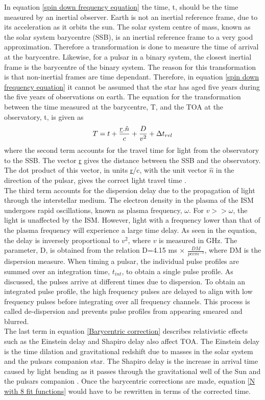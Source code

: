 \documentclass[12pt]{article}
\begin{document}
	\noindent In equation \ref{spin down frequency equation} the time, t, should be the time measured by an inertial observer. Earth is not an inertial reference frame, due to its acceleration as it orbits the sun. The solar system centre of mass, known as the solar system barycentre (SSB), is an inertial reference frame to a very good approximation. Therefore a transformation is done to measure the time of arrival at the barycentre. Likewise, for a pulsar in a binary system, the closest inertial frame is the barycentre of the binary system. The reason for this transformation is that non-inertial frames are time dependant. Therefore, in equation \ref{spin down frequency equation} it cannot be assumed that the star has aged five years during the five years of observations on earth. The equation for the transformation between the time measured at the barycentre, T, and the TOA at the observatory, t, is given as
	\begin{equation}\label{Barycentric correction}
	T=t+\frac{\uline{r}.\hat{n}}{c}+\frac{D}{v^2}+\Delta t_{rel}
	\end{equation}
	where the second term accounts for the travel time for light from the observatory to the SSB. The vector \uline{r} gives the distance between the SSB and the observatory. The dot product of this vector, in units \uline{r}/c, with the unit vector $\hat{n}$ in the direction of the pulsar, gives the correct light travel time \cite{backer1986pulsar}.\\ 
	
	\noindent The third term accounts for the dispersion delay due to the propagation of light through the interstellar medium. The electron density in the plasma of the ISM undergoes rapid oscillations, known as plasma frequency, $\omega$. For $v>>\omega$, the light is unaffected by the ISM. However, light with a frequency lower than that of the plasma frequency will experience a large time delay. As seen in the equation, the delay is inversely proportional to $v^2$, where $v$ is measured in GHz. The parameter, D, is obtained from the relation D=4.15 ms $\times$ $\frac{DM}{pc cm^{-3}}$, where DM is the dispersion measure. When timing a pulsar, the individual pulse profiles are summed over an integration time, $t_{int}$, to obtain a single pulse profile. As discussed, the pulses arrive at different times due to dispersion. To obtain an integrated pulse profile, the high frequency pulses are delayed to align with low frequency pulses before integrating over all frequency channels. This process is called de-dispersion and prevents pulse profiles from appearing smeared and blurred.\\
	The last term in equation \ref{Barycentric correction} describes relativistic effects such as the Einstein delay and Shapiro delay also affect TOA. The Einstein delay is the time dilation and gravitational redshift due to masses in the solar system and the pulsars companion star. The Shapiro delay is the increase in arrival time caused by light bending as it passes through the gravitational well of the Sun and the pulsars companion \cite{stairs2003testing}. Once the barycentric corrections are made, equation \ref{N with 8 fit functions} would have to be rewritten in terms of the corrected time.\\  
	
\end{document}

